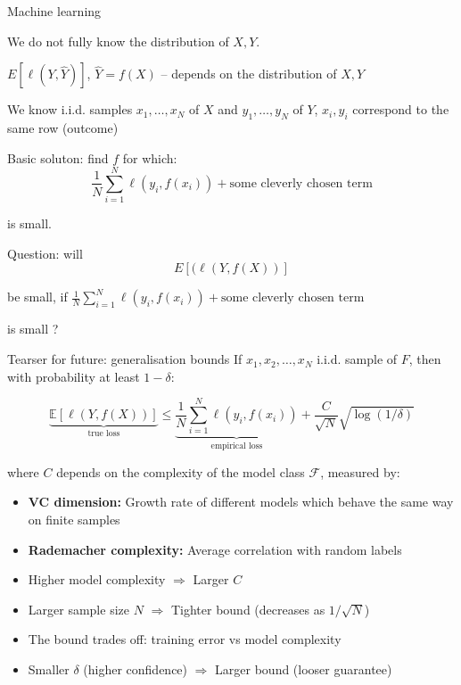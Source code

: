 \documentclass{beamer}
\begin{document}
\begin{frame}{Machine learning}
 

	We do not fully know the distribution of $X,Y$.

\medskip

	$E[\ell(Y, \hat{Y})]$, $\hat{Y}=f(X)$  -- depends on the distribution of $X,Y$


 \bigskip

	We know i.i.d. samples $x_1,\ldots, x_N$ of $X$
    and $y_1,\ldots,y_N$ of $Y$, $x_i,y_i$ correspond to the same row (outcome)

  \bigskip

  Basic soluton: find $f$ for which: 
   \[ \frac{1}{N} \sum_{i=1}^{N} \ell(y_i,f(x_i))+ \mbox{some cleverly chosen term} \]

   is small. 


  \medskip

   Question:  will 
           $$E[(\ell(Y,f(X))]$$

   be small, if  
   \( \frac{1}{N} \sum_{i=1}^{N} \ell(y_i,f(x_i))+ \mbox{some cleverly chosen term} \)

    is small ? 
    

\end{frame}
\begin{frame}{Tearser for future: generalisation bounds}
  If $x_1,x_2,\ldots, x_N$ i.i.d. sample
of $F$, then with probability at least $1-\delta$:

\[
\underbrace{\mathbb{E}[\ell(Y, f(X))]}_{\text{true loss}} \le \underbrace{\frac{1}{N} \sum_{i=1}^{N} \ell(y_i, f(x_i))}_{\text{empirical loss}} + \frac{C}{\sqrt{N}} \sqrt{\log(1/\delta)}
\]

where $C$ depends on the complexity of the model class $\mathcal{F}$, measured by:

\begin{itemize}
    \item \textbf{VC dimension:} Growth rate of different models which behave the same way on finite samples
    \item \textbf{Rademacher complexity:} Average correlation with random labels
\end{itemize}

\medskip 

\begin{itemize}
    \item Higher model complexity $\Rightarrow$ Larger $C$
    \item Larger sample size $N$ $\Rightarrow$ Tighter bound (decreases as $1/\sqrt{N}$)
    \item The bound trades off: training error vs model complexity
    \item Smaller $\delta$ (higher confidence) $\Rightarrow$ Larger bound (looser guarantee)
\end{itemize}

\end{frame}
\end{document}
